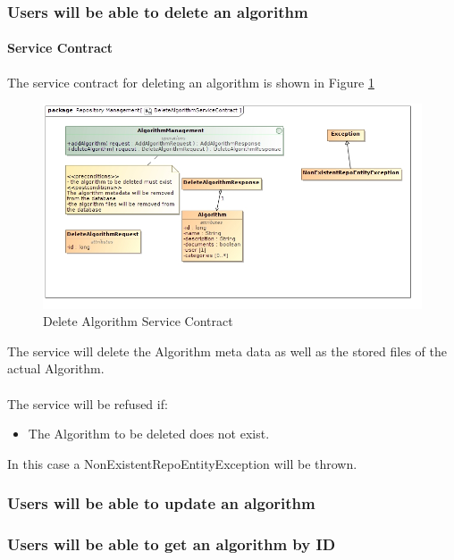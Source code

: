 \subsubsection {Users will be able to delete an algorithm}
\paragraph{Service Contract}
The service contract for deleting an algorithm is shown in Figure \ref{fig:deleteAlgorithmService}

\begin{figure}[H]
  \begin{center}
  \includegraphics[scale=0.5]{../Diagrams and Charts/Test Data/DeleteAlgorithmServiceContract.jpg}
  \caption{Delete Algorithm Service Contract}
  \label{fig:deleteAlgorithmService}
  \end{center}  
 \end{figure}

 The service will delete the Algorithm meta data as well as the stored files
 of the actual Algorithm.\\\\
 The service will be refused if:\\
	 \begin{itemize}
	 	\item The Algorithm to be deleted does not exist.
	 \end{itemize}
In this case a NonExistentRepoEntityException will be thrown.
\subsubsection {Users will be able to update an algorithm}
\subsubsection {Users will be able to get an algorithm by ID}
